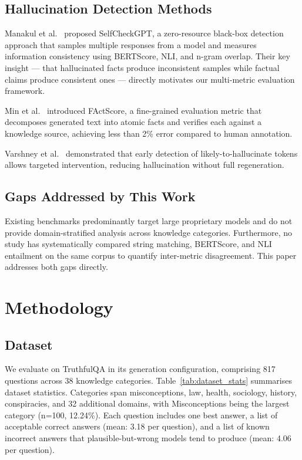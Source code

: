 \documentclass[conference]{IEEEtran}
\begin{document}
\subsection{Hallucination Detection Methods}

Manakul et al.~\cite{manakul2023selfcheck} proposed
SelfCheckGPT, a zero-resource black-box detection approach
that samples multiple responses from a model and measures
information consistency using BERTScore, NLI, and n-gram
overlap.
Their key insight — that hallucinated facts produce
inconsistent samples while factual claims produce consistent
ones — directly motivates our multi-metric evaluation
framework.

Min et al.~\cite{min2023factscore} introduced FActScore,
a fine-grained evaluation metric that decomposes generated
text into atomic facts and verifies each against a knowledge
source, achieving less than 2\% error compared to human
annotation.

Varshney et al.~\cite{varshney2023stitch} demonstrated that
early detection of likely-to-hallucinate tokens allows
targeted intervention, reducing hallucination without
full regeneration.

\subsection{Gaps Addressed by This Work}

Existing benchmarks predominantly target large proprietary
models and do not provide domain-stratified analysis across
knowledge categories.
Furthermore, no study has systematically compared string
matching, BERTScore, and NLI entailment on the same corpus
to quantify inter-metric disagreement.
This paper addresses both gaps directly.

\section{Methodology}
\label{sec:methodology}

\subsection{Dataset}

We evaluate on TruthfulQA \cite{lin2022truthfulqa} in its
generation configuration, comprising 817 questions across
38 knowledge categories.
Table~\ref{tab:dataset_stats} summarises dataset statistics.
Categories span misconceptions, law, health, sociology,
history, conspiracies, and 32 additional domains, with
Misconceptions being the largest category (n=100, 12.24\%).
Each question includes one best answer, a list of acceptable
correct answers (mean: 3.18 per question), and a list of
known incorrect answers that plausible-but-wrong models
tend to produce (mean: 4.06 per question).
\end{document}
